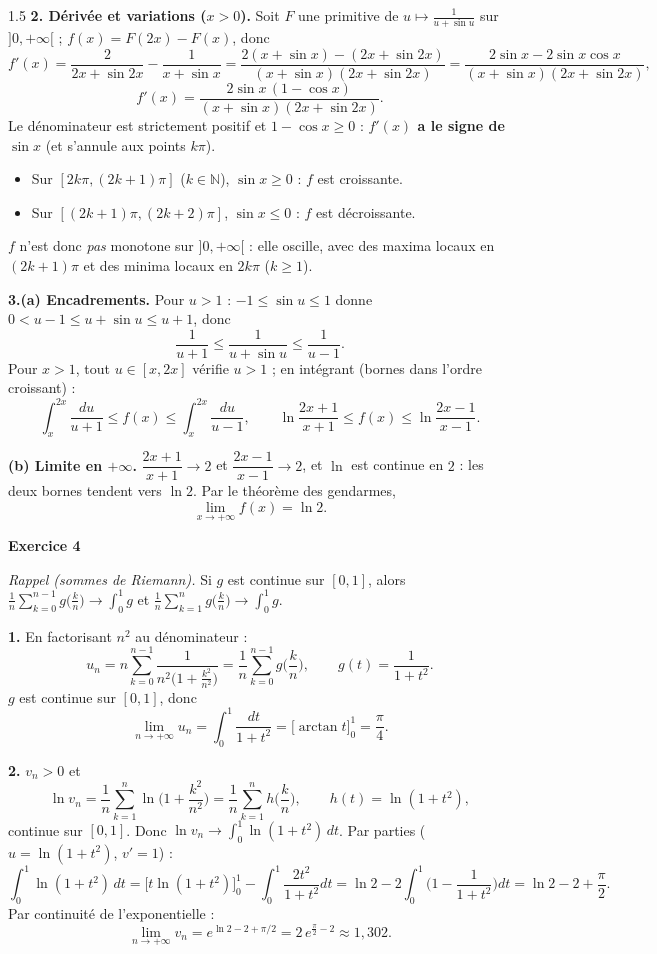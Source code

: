 \documentclass[12pt]{article}
\begin{document}
\begin{spacing}{1.5}
\textbf{2. Dérivée et variations ($x>0$).} Soit $F$ une primitive de $u\mapsto\frac1{u+\sin u}$ sur $]0,+\infty[$ ; $f(x)=F(2x)-F(x)$, donc
\[
f'(x)=\frac{2}{2x+\sin2x}-\frac{1}{x+\sin x}=\frac{2(x+\sin x)-(2x+\sin2x)}{(x+\sin x)(2x+\sin2x)}=\frac{2\sin x-2\sin x\cos x}{(x+\sin x)(2x+\sin2x)},
\]
\[
\boxed{f'(x)=\frac{2\sin x\,(1-\cos x)}{(x+\sin x)(2x+\sin2x)}}.
\]
Le dénominateur est strictement positif et $1-\cos x\ge0$ : \textbf{$f'(x)$ a le signe de $\sin x$} (et s'annule aux points $k\pi$).
\begin{itemize}
\item Sur $[2k\pi,(2k+1)\pi]$ ($k\in\mathbb{N}$), $\sin x\ge0$ : $f$ est croissante.
\item Sur $[(2k+1)\pi,(2k+2)\pi]$, $\sin x\le0$ : $f$ est décroissante.
\end{itemize}
$f$ n'est donc \emph{pas} monotone sur $]0,+\infty[$ : elle oscille, avec des maxima locaux en $(2k+1)\pi$ et des minima locaux en $2k\pi$ ($k\ge1$).

\textbf{3.(a) Encadrements.} Pour $u>1$ : $-1\le\sin u\le1$ donne $0<u-1\le u+\sin u\le u+1$, donc
\[
\frac1{u+1}\le\frac1{u+\sin u}\le\frac1{u-1}.
\]
Pour $x>1$, tout $u\in[x,2x]$ vérifie $u>1$ ; en intégrant (bornes dans l'ordre croissant) :
\[
\int_x^{2x}\frac{du}{u+1}\le f(x)\le\int_x^{2x}\frac{du}{u-1},\qquad\boxed{\ln\frac{2x+1}{x+1}\le f(x)\le\ln\frac{2x-1}{x-1}}.
\]

\textbf{(b) Limite en $+\infty$.} $\dfrac{2x+1}{x+1}\to2$ et $\dfrac{2x-1}{x-1}\to2$, et $\ln$ est continue en $2$ : les deux bornes tendent vers $\ln2$. Par le théorème des gendarmes,
\[
\boxed{\lim_{x\to+\infty}f(x)=\ln2}.
\]

\medskip\textbf{Exercice 4}

\emph{Rappel (sommes de Riemann).} Si $g$ est continue sur $[0,1]$, alors $\displaystyle\frac1n\sum_{k=0}^{n-1}g\Big(\frac kn\Big)\to\int_0^1g$ et $\displaystyle\frac1n\sum_{k=1}^{n}g\Big(\frac kn\Big)\to\int_0^1g$.

\textbf{1.} En factorisant $n^2$ au dénominateur :
\[
u_n=n\sum_{k=0}^{n-1}\frac{1}{n^2\big(1+\frac{k^2}{n^2}\big)}=\frac1n\sum_{k=0}^{n-1}g\Big(\frac kn\Big),\qquad g(t)=\frac1{1+t^2}.
\]
$g$ est continue sur $[0,1]$, donc
\[
\lim_{n\to+\infty}u_n=\int_0^1\frac{dt}{1+t^2}=\Big[\arctan t\Big]_0^1=\boxed{\frac\pi4}.
\]

\textbf{2.} $v_n>0$ et
\[
\ln v_n=\frac1n\sum_{k=1}^n\ln\Big(1+\frac{k^2}{n^2}\Big)=\frac1n\sum_{k=1}^nh\Big(\frac kn\Big),\qquad h(t)=\ln(1+t^2),
\]
continue sur $[0,1]$. Donc $\ln v_n\to\displaystyle\int_0^1\ln(1+t^2)\,dt$. Par parties ($u=\ln(1+t^2)$, $v'=1$) :
\[
\int_0^1\ln(1+t^2)\,dt=\Big[t\ln(1+t^2)\Big]_0^1-\int_0^1\frac{2t^2}{1+t^2}dt=\ln2-2\int_0^1\Big(1-\frac1{1+t^2}\Big)dt=\ln2-2+\frac\pi2 .
\]
Par continuité de l'exponentielle :
\[
\boxed{\lim_{n\to+\infty}v_n=e^{\ln2-2+\pi/2}=2\,e^{\frac\pi2-2}\approx1{,}302}.
\]

\end{spacing}
\end{document}
